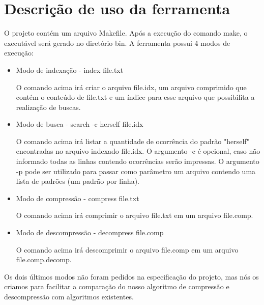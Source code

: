\section{Descrição de uso da ferramenta \ipmt}

O projeto contém um arquivo Makefile. Após a execução do comando make, o
executável \ipmt será gerado no diretório bin. A ferramenta \ipmt possui 4 modos
de execução:

\begin{itemize}

\item Modo de indexação - \ipmt index file.txt

    O comando acima irá criar o arquivo file.idx, um arquivo comprimido que
    contém o conteúdo de file.txt e um índice para esse arquivo que possibilita
    a realização de buscas.

\item Modo de busca - \ipmt search -c herself file.idx

    O comando acima irá listar a quantidade de ocorrência do padrão "herself"
    encontradas no arquivo indexado file.idx. O argumento -c é opcional, caso
    não informado todas as linhas contendo ocorrências serão impressas. O
    argumento -p pode ser utilizado para passar como parâmetro um arquivo
    contendo uma lista de padrões (um padrão por linha).

\item Modo de compressão - \ipmt compress file.txt

    O comando acima irá comprimir o arquivo file.txt em um arquivo file.comp.

\item Modo de descompressão - \ipmt decompress file.comp

    O comando acima irá descomprimir o arquivo file.comp em um arquivo
    file.comp.decomp.

\end{itemize}

Os dois últimos modos não foram pedidos na especificação do projeto, mas nós os
criamos para facilitar a comparação do nosso algoritmo de compressão e
descompressão com algoritmos existentes.
